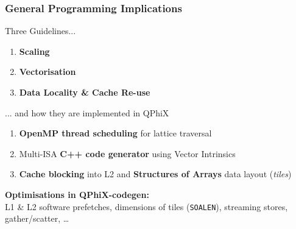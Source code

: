 \documentclass{beamer}
\begin{document}
  \begin{frame}
    \frametitle{General Programming Implications}

    Three Guidelines...
    \begin{enumerate}
      \item \textbf{Scaling}
      \item \textbf{Vectorisation}
      \item \textbf{Data Locality \& Cache Re-use}
    \end{enumerate}
    \vfill

    ... and how they are implemented in QPhiX
    \begin{enumerate}
      \item \textbf{OpenMP thread scheduling} for lattice traversal
      \item Multi-ISA \textbf{C++ code generator} using Vector Intrinsics
      \item \textbf{Cache blocking} into L2 and \textbf{Structures of Arrays} data layout (\textit{tiles})
    \end{enumerate}
    \vfill

    \textbf{Optimisations in QPhiX-codegen:}\\
    L1 \& L2 software prefetches,
    dimensions of tiles (\texttt{SOALEN}),
    streaming stores, gather/scatter, \dots

  \end{frame}

\end{document}
